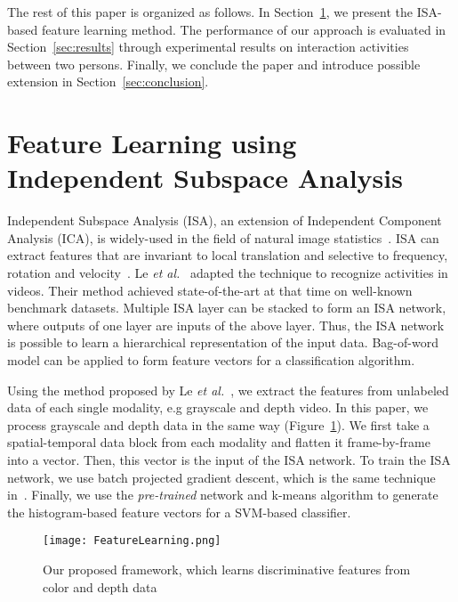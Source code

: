 \documentclass{article}
\begin{document}
The rest of this paper is organized as follows.
In Section~\ref{sec:single}, we present the ISA-based feature learning method.
The performance of our approach is evaluated in Section~\ref{sec:results} through experimental results on interaction activities between two persons.
Finally, we conclude the paper and introduce possible extension in Section~\ref{sec:conclusion}.

\section{Feature Learning using Independent Subspace Analysis}
\label{sec:single}

Independent Subspace Analysis (ISA), an extension of Independent Component Analysis (ICA), is widely-used in the field of natural image statistics~\cite{2009_Hyvrinen_NaturalImgStat}.
ISA can extract features that are invariant to local translation and selective to frequency, rotation and velocity~\cite{2011_Le_ISA}.
Le \textit{et al.}~\cite{2011_Le_ISA} adapted the technique to recognize activities in videos.
Their method achieved state-of-the-art at that time on well-known benchmark datasets. 
Multiple ISA layer can be stacked to form an ISA network, where outputs of one layer are inputs of the above layer.
Thus, the ISA network is possible to learn a hierarchical representation of the input data.
Bag-of-word model can be applied to form feature vectors for a classification algorithm.

Using the method proposed by Le \textit{et al.}~\cite{2011_Le_ISA}, we extract the features from unlabeled data of each single modality, e.g grayscale and depth video.
In this paper, we process grayscale and depth data in the same way (Figure~\ref{fig:featurelearning}).
We first take a spatial-temporal data block from each modality and flatten it frame-by-frame into a vector.
Then, this vector is the input of the ISA network.
To train the ISA network, we use batch projected gradient descent, which is the same technique in~\cite{2011_Le_ISA}.
Finally, we use the \textit{pre-trained} network and k-means algorithm to generate the histogram-based feature vectors for a SVM-based classifier.

\begin{figure}[!htb]
	\centering
	\texttt{[image: FeatureLearning.png]}
	\caption{Our proposed framework, which learns discriminative features from color and depth data}
	\label{fig:featurelearning}
\end{figure}
\end{document}

